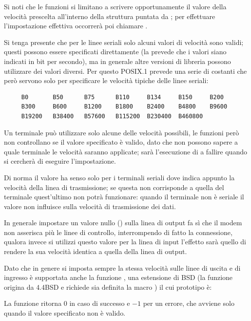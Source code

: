 Si noti che le funzioni si limitano a scrivere opportunamente il valore della
velocità prescelta  all'interno della struttura puntata da
; per effettuare l'impostazione effettiva occorrerà poi
chiamare .

Si tenga presente che per le linee seriali solo alcuni valori di velocità sono
validi; questi possono essere specificati direttamente (la 
prevede che i valori siano indicati in bit per secondo), ma in generale
altre versioni di libreria possono utilizzare dei valori diversi. Per questo
POSIX.1 prevede una serie di costanti che però servono solo per specificare le
velocità tipiche delle linee seriali:
\begin{verbatim}
     B0       B50      B75      B110     B134     B150     B200     
     B300     B600     B1200    B1800    B2400    B4800    B9600    
     B19200   B38400   B57600   B115200  B230400  B460800
\end{verbatim}

Un terminale può utilizzare solo alcune delle velocità possibili, le funzioni
però non controllano se il valore specificato è valido, dato che non possono
sapere a quale terminale le velocità saranno applicate; sarà l'esecuzione di
 a fallire quando si cercherà di eseguire l'impostazione.

Di norma il valore ha senso solo per i terminali seriali dove indica appunto
la velocità della linea di trasmissione; se questa non corrisponde a quella
del terminale quest'ultimo non potrà funzionare: quando il terminale non è
seriale il valore non influisce sulla velocità di trasmissione dei dati. 

In generale impostare un valore nullo () sulla linea di output fa sì
che il modem non asserisca più le linee di controllo, interrompendo di fatto
la connessione, qualora invece si utilizzi questo valore per la linea di input
l'effetto sarà quello di rendere la sua velocità identica a quella della linea
di output.

Dato che in genere si imposta sempre la stessa velocità sulle linee di uscita
e di ingresso è supportata anche la funzione , una
estensione di BSD (la funzione origina da 4.4BSD e richiede sia definita la
macro ) il cui prototipo è:

\begin{funcproto}{
}

{La funzione ritorna $0$ in caso di successo e $-1$ per un errore, che avviene
  solo quando il valore specificato non è valido.}
\end{funcproto}

